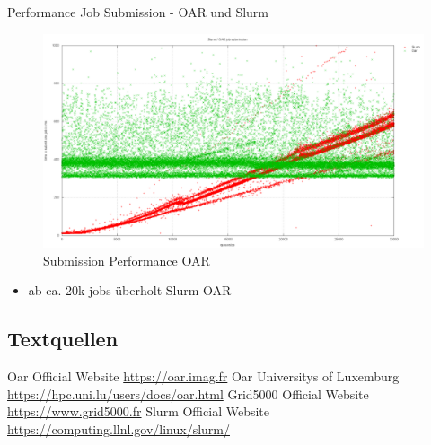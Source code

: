 \documentclass[10pt,utf8]{beamer}
\begin{document}
\begin{frame}{Performance Job Submission - OAR und Slurm}
    \begin{figure}
    \centering
	\includegraphics[scale=0.20, keepaspectratio]{../output/pics/oar_slurm.png}
    \caption{Submission Performance OAR}
    \end{figure}
    \begin{itemize}
        \item{ab ca. 20k jobs überholt Slurm OAR}
    \end{itemize}
\end{frame}

\subsection*{Textquellen}
\begin{frame}
	\begin{itemize}[]
	    \bibitem [0] {} Oar Official Website \url{https://oar.imag.fr}
	    \bibitem [1] {} Oar Universitys of Luxemburg \url{https://hpc.uni.lu/users/docs/oar.html}
	    \bibitem [2] {} Grid5000 Official Website \url{https://www.grid5000.fr}
	    \bibitem [3] {} Slurm Official Website \url{https://computing.llnl.gov/linux/slurm/}
    \end{itemize}
\end{frame}
\end{document}
